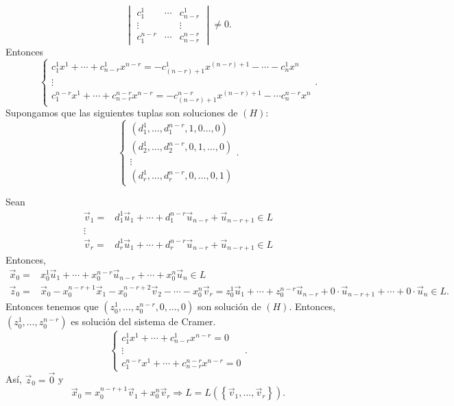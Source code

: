 \[ \begin{vmatrix} c^{1}_{1} & \cdots & c^{1}_{n-r} \\
	\vdots & & \vdots \\
c^{n-r}_{1} & \cdots & c^{n-r}_{n-r}\end{vmatrix} \neq 0 .\]
Entonces
\[
\begin{cases}
c^{1}_{1}x^{1} + \cdots + c^{1}_{n-r}x^{n-r} = -c^{1}_{\left(n-r\right)+1}x^{\left(n-r\right)+1} - \cdots - c^{1}_{n}x^{n} \\
\vdots \\
c^{n-r}_{1}x^{1}+\cdots + c^{n-r}_{n-r}x^{n-r} = -c^{n-r}_{\left(n-r\right)+1}x^{\left(n-r\right)+1} - \cdots c^{n-r}_{n}x^{n}
\end{cases}
.\]
Supongamos que las siguientes tuplas son soluciones de $\displaystyle \left(H\right) $:
\[
\begin{cases}
	\left(d^{1}_{1}, \ldots, d^{n-r}_{1}, 1, 0 \ldots, 0\right) \\
	\left(d^{1}_{2}, \ldots, d^{n-r}_{2}, 0, 1, \ldots, 0\right) \\
	\vdots \\
	\left(d^{1}_{r}, \ldots, d^{n-r}_{r},0, \ldots,0, 1\right)
\end{cases}
.\]

Sean 
\[
\begin{split}
	\vec{v}_{1} = & d^{1}_{1}\vec{u}_{1} + \cdots + d^{n-r}_{1}\vec{u}_{n-r} + \vec{u}_{n-r+1} \in L \\
	\vdots & \\
	\vec{v}_{r} = & d^{1}_{r}\vec{u}_{1} + \cdots + d^{n-r}_{r}\vec{u}_{n-r} + \vec{u}_{n-r+1} \in L
\end{split}
\]
Entonces, 
\[
\begin{split}
	\vec{x}_{0} = & x^{1}_{0}\vec{u}_{1} + \cdots + x^{n-r}_{0}\vec{u}_{n-r}+\cdots + x^{n}_{0}\vec{u}_{n} \in L \\
	\vec{z}_{0} = & \vec{x}_{0}-x^{n-r+1}_{0}\vec{x}_{1}-x_{0}^{n-r+2}\vec{v}_{2} - \cdots - x^{n}_{0}\vec{v}_{r} = z^{1}_{0}\vec{u}_{1} + \cdots + z^{n-r}_{0}\vec{u}_{n-r} + 0 \cdot \vec{u}_{n-r+1} + \cdots + 0 \cdot \vec{u}_{n} \in L.
\end{split}
\]
Entonces tenemos que $\displaystyle \left(z^{1}_{0}, \ldots, z^{n-r}_{0}, 0, \ldots, 0\right) $ son solución de $\displaystyle \left(H\right) $. Entonces, $\displaystyle \left(z^{1}_{0}, \ldots, z^{n-r}_{0}\right) $ es solución del sistema de Cramer. 
\[
\begin{cases}
c^{1}_{1}x^{1} + \cdots + c^{1}_{n-r}x^{n-r} = 0 \\
\vdots \\
c^{n-r}_{1}x^{1} + \cdots + c^{n-r}_{n-r}x^{n-r} = 0
\end{cases}
.\]
Así, $\displaystyle \vec{z}_{0} = \vec{0} $ y 
\[\vec{x}_{0} = x_{0}^{n-r+1}\vec{v}_{1} + x^{n}_{0}\vec{v}_{r} \Rightarrow L = L\left( \left\{ \vec{v}_{1}, \ldots, \vec{v}_{r}\right\} \right) .\]

